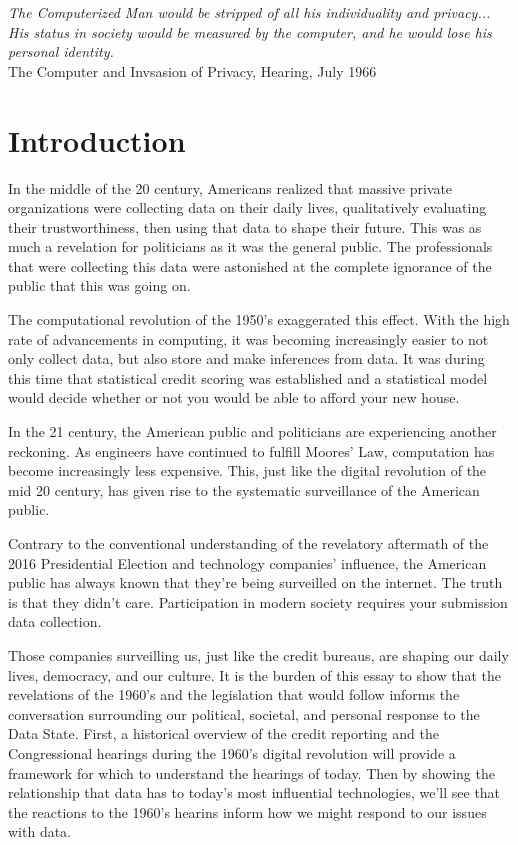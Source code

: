 \begin{center}
\textit{
The Computerized Man would be stripped of all his individuality and privacy...
His status in society would be measured by the computer,
and he would lose his personal identity.} \\
The Computer and Invsasion of Privacy, Hearing, July 1966
\end{center}

\section{Introduction}

In the middle of the 20 century, Americans realized that massive private
organizations were collecting data on their daily lives, qualitatively
evaluating their trustworthiness, then using that data to shape their future.
This was as much a revelation for politicians as it was the general public.
The professionals that were collecting this data were astonished at the complete
ignorance of the public that this was going on.

The computational revolution of the 1950's exaggerated this effect. With the
high rate of advancements in computing, it was becoming increasingly easier to
not only collect data, but also store and make inferences from data. It was
during this time that statistical credit scoring was established and a
statistical model would decide whether or not you would be able to afford your
new house.

In the 21 century, the American public and politicians are experiencing
another reckoning. As engineers have continued to fulfill Moores' Law,
computation has become increasingly less expensive. This, just like the digital
revolution of the mid 20 century, has given rise to the systematic
surveillance of the American public.

Contrary to the conventional understanding of the revelatory aftermath of the
2016 Presidential Election and technology companies' influence, the American
public has always known that they're being surveilled on the internet. The
truth is that they didn't care. Participation in modern society requires your
submission data collection.

Those companies surveilling us, just like the credit bureaus, are shaping our
daily lives, democracy, and our culture.  It is the burden of this essay to
show that the revelations of the 1960's and the legislation that would follow %
informs the conversation surrounding our political,
societal, and personal response to the Data State. %
First, a historical overview of the credit reporting and the Congressional
hearings during the 1960's digital revolution will provide a framework for
which to understand the hearings of today. Then by showing the relationship
that data has to today's most influential technologies, we'll see that the
reactions to the 1960's hearins inform how we might respond to our issues with
data.

